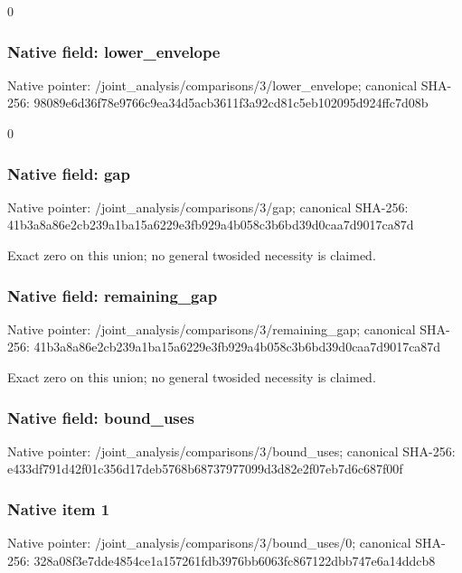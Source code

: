 \documentclass[10pt,a4paper]{article}
\begin{document}
0


\subsubsection{Native field: lower\_envelope}


Native pointer: /joint\_analysis/comparis\allowbreak{}ons/3/lower\_envelope; canonical SHA-256: 98089e6d36f78e9766c9ea34\allowbreak{}d5acb3611f3a92cd81c5eb10\allowbreak{}2095d924ffc7d08b


0


\subsubsection{Native field: gap}


Native pointer: /joint\_analysis/comparisons/3/gap; canonical SHA-256: 41b3a8a86e2cb239a1ba15a6\allowbreak{}229e3fb929a4b058c3b6bd39\allowbreak{}d0caa7d9017ca87d


Exact zero on this union; no general twosided necessity is claimed.


\subsubsection{Native field: remaining\_gap}


Native pointer: /joint\_analysis/comparis\allowbreak{}ons/3/remaining\_gap; canonical SHA-256: 41b3a8a86e2cb239a1ba15a6\allowbreak{}229e3fb929a4b058c3b6bd39\allowbreak{}d0caa7d9017ca87d


Exact zero on this union; no general twosided necessity is claimed.


\subsubsection{Native field: bound\_uses}


Native pointer: /joint\_analysis/comparis\allowbreak{}ons/3/bound\_uses; canonical SHA-256: e433df791d42f01c356d17de\allowbreak{}b5768b68737977099d3d82e2\allowbreak{}f07eb7d6c687f00f



\subsubsection{Native item 1}


Native pointer: /joint\_analysis/comparis\allowbreak{}ons/3/bound\_uses/0; canonical SHA-256: 328a08f3e7dde4854ce1a157\allowbreak{}261fdb3976bb6063fc867122\allowbreak{}dbb747e6a14ddcb8
\end{document}
